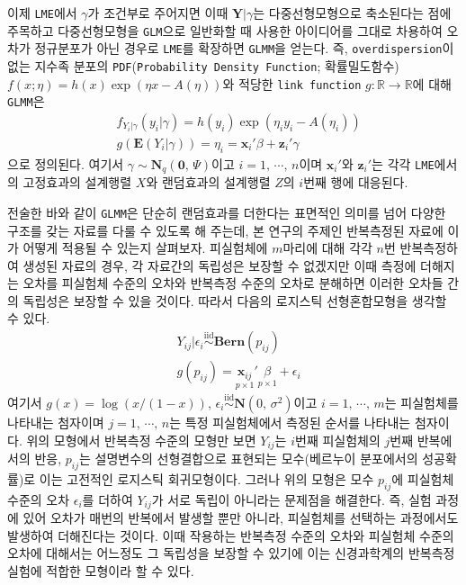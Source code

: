 \documentclass[11pt,onecolumn,twoside,a4size]{gsag3jnl}
\newcommand{\iid}{\stackrel{\mathrm{iid}}{\sim}}
\begin{document}
이제 \texttt{LME}에서 $\gamma$가 조건부로 주어지면 이때 $\mathbf{Y}\vert\gamma$는 다중선형모형으로 축소된다는 점에 주목하고 다중선형모형을 \texttt{GLM}으로 일반화할 때 사용한 아이디어를 그대로 차용하여 오차가 정규분포가 아닌 경우로 \texttt{LME}를 확장하면 \texttt{GLMM}을 얻는다. 즉, \texttt{overdispersion}이 없는 지수족 분포의 \texttt{PDF}(\texttt{Probability Density Function}; 확률밀도함수) $f(x;\eta)=h(x)\exp(\eta x-A(\eta))$와 적당한 \texttt{link function} $g:\mathbb{R}\to\mathbb{R}$에 대해 \texttt{GLMM}은 
\begin{align}\label{eq:glmm_model}
  &f_{Y_i\vert\gamma}(y_i\vert\gamma)=h(y_i)\exp(\eta_iy_i-A(\eta_i))\\
  &g(\mathbf{E}(Y_i\vert\gamma))=\eta_i=\mathbf{x}_i'\beta+\mathbf{z}_i'\gamma\nonumber
\end{align}
으로 정의된다. 여기서 $\gamma\sim\mathbf{N}_q(\mathbf{0},\,\Psi)$이고 $i=1,\,\cdots,\,n$이며 $\mathbf{x}_i'$와 $\mathbf{z}_i'$는 각각 \texttt{LME}에서의 고정효과의 설계행렬 $X$와 랜덤효과의 설계행렬 $Z$의 $i$번째 행에 대응된다.

전술한 바와 같이 \texttt{GLMM}은 단순히 랜덤효과를 더한다는 표면적인 의미를 넘어 다양한 구조를 갖는 자료를 다룰 수 있도록 해 주는데, 본 연구의 주제인 반복측정된 자료에 이가 어떻게 적용될 수 있는지 살펴보자. 피실험체에 $m$마리에 대해 각각 $n$번 반복측정하여 생성된 자료의 경우, 각 자료간의 독립성은 보장할 수 없겠지만 이때 측정에 더해지는 오차를 피실험체 수준의 오차와 반복측정 수준의 오차로 분해하면 이러한 오차들 간의 독립성은 보장할 수 있을 것이다. 따라서 다음의 로지스틱 선형혼합모형을 생각할 수 있다.
\begin{align}\label{eq:hierachy_model}
  &Y_{ij}\vert\epsilon_i\iid\mathbf{Bern}(p_{ij})\\
  &g(p_{ij})=\underset{p\times1}{\mathbf{x}_{ij}}'\underset{p\times1}{\beta}+\epsilon_i\nonumber
\end{align}
여기서 $g(x)=\log(x/(1-x))$, $\epsilon_i\iid\mathbf{N}(0,\,\sigma^2)$이고 $i=1,\,\cdots,\,m$는 피실험체를 나타내는 첨자이며 $j=1,\,\cdots,\,n$는 특정 피실험체에서 측정된 순서를 나타내는 첨자이다. 위의 모형에서 반복측정 수준의 모형만 보면 $Y_{ij}$는 $i$번째 피실험체의 $j$번째 반복에서의 반응, $p_{ij}$는 설명변수의 선형결합으로 표현되는 모수(베르누이 분포에서의 성공확률)로 이는 고전적인 로지스틱 회귀모형이다. 그러나 위의 모형은 모수 $p_{ij}$에 피실험체 수준의 오차 $\epsilon_i$를 더하여 $Y_{ij}$가 서로 독립이 아니라는 문제점을 해결한다. 즉, 실험 과정에 있어 오차가 매번의 반복에서 발생할 뿐만 아니라, 피실험체를 선택하는 과정에서도 발생하여 더해진다는 것이다. 이때 작용하는 반복측정 수준의 오차와 피실험체 수준의 오차에 대해서는 어느정도 그 독립성을 보장할 수 있기에 이는 신경과학계의 반복측정 실험에 적합한 모형이라 할 수 있다.
\end{document}
